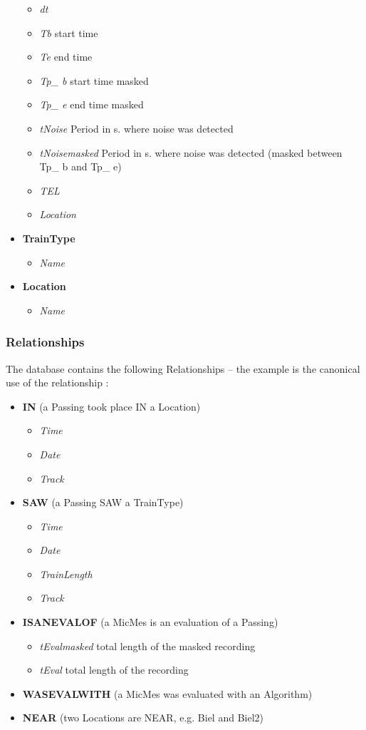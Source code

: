 \documentclass{article}\usepackage[]{graphicx}\usepackage[]{color}
\begin{document}
\begin{itemize}
\begin{itemize}
    \item {\it dt}
    \item {\it Tb} start time
    \item {\it Te} end time
    \item {\it Tp\_ b} start time masked
    \item {\it Tp\_ e} end time masked
    \item {\it tNoise} Period in s. where noise was detected
    \item {\it tNoisemasked} Period in s. where noise was detected (masked between Tp\_ b and Tp\_ e)
    \item {\it TEL}
    \item {\it Location}
  \end{itemize}
\item {\bf TrainType}
  \begin{itemize}
    \item {\it Name}
  \end{itemize}
\item {\bf Location}
  \begin{itemize}
    \item {\it Name}
  \end{itemize}
\end{itemize}
\subsubsection{Relationships} 
The database contains the following Relationships -- the example is the canonical use of the relationship :
\begin{itemize}
\item {\bf IN} (a Passing took place IN a Location)
  \begin{itemize}
    \item {\it Time}
    \item {\it Date}
    \item {\it Track}
  \end{itemize}
\item {\bf SAW} (a Passing SAW a TrainType)
  \begin{itemize}
    \item {\it Time}
    \item {\it Date}
    \item {\it TrainLength}
    \item {\it Track}
  \end{itemize}
\item {\bf ISANEVALOF} (a MicMes is an evaluation of a Passing)
  \begin{itemize}
    \item {\it tEvalmasked} total length of the masked recording
    \item {\it tEval} total length of the recording
  \end{itemize}
\item {\bf WASEVALWITH} (a MicMes was evaluated with an Algorithm)
\item {\bf NEAR} (two Locations are NEAR, e.g. Biel and Biel2)
\end{itemize}
\end{document}
